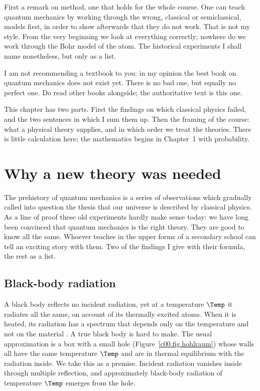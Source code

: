 First a remark on method, one that holds for the whole course. One can teach quantum
mechanics by working through the wrong, classical or semiclassical, models first, in order to
show afterwards that they do not work. That is not my style. From the very beginning we look
at everything correctly; nowhere do we work through the Bohr model of the atom. The
historical experiments I shall name nonetheless, but only as a list.

I am not recommending a textbook to you: in my opinion the best book on quantum mechanics
does not exist yet. There is no bad one, but equally no perfect one. Do read other books
alongside; the authoritative text is this one.

This chapter has two parts. First the findings on which classical physics failed, and the two
sentences in which I sum them up. Then the framing of the course: what a physical theory
supplies, and in which order we treat the theories. There is little calculation here; the
mathematics begins in Chapter~1 with probability.

\section{Why a new theory was needed}\label{c00.s4}

The prehistory of quantum mechanics is a series of observations which gradually called into
question the thesis that our universe is described by classical physics. As a line of proof
these old experiments hardly make sense today: we have long been convinced that quantum
mechanics is the right theory. They are good to know all the same. Whoever teaches in the
upper forms of a secondary school can tell an exciting story with them. Two of the findings
I give with their formula, the rest as a list.

\subsection{Black-body radiation}\label{c00.s4.1}

A black body reflects no incident radiation, yet at a temperature $\Temp$ it radiates all the
same, on account of its thermally excited atoms. When it is heated, its radiation has a
spectrum that depends only on the temperature and not on the material
. A true black body is hard to make. The
usual approximation is a box with a small hole (Figure~\ref{c00.fig.hohlraum}) whose walls
all have the same temperature $\Temp$ and are in thermal equilibrium with the radiation
inside. We take this as a premise. Incident radiation vanishes inside through multiple
reflection, and approximately black-body radiation of temperature $\Temp$ emerges from the
hole.

